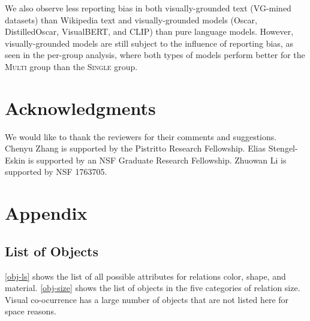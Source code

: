 \documentclass[11pt]{article}
\newcommand{\Single}{{\scshape Single}}
\newcommand{\Multi}{{\scshape Multi}}
\begin{document}
We also observe less reporting bias in both visually-grounded text (VG-mined datasets) than Wikipedia text and visually-grounded models (Oscar, DistilledOscar, VisualBERT, and CLIP) than pure language models. However, visually-grounded models are still subject to the influence of reporting bias, as seen in the per-group analysis, where both types of models perform better for the \Multi{} group than the \Single{} group.

\section*{Acknowledgments}
We would like to thank the reviewers for their comments and suggestions. 
Chenyu Zhang is supported by the Pistritto Research Fellowship.
Elias Stengel-Eskin is supported by an NSF Graduate Research Fellowship. 
Zhuowan Li is supported by NSF 1763705.



\newpage




\newpage

\appendix
\section{Appendix}
\subsection{List of Objects}
\label{sec:list-objs}

\cref{obj-ls} shows the list of all possible attributes for relations color, shape, and material. \cref{obj-size} shows the list of objects in the five categories of relation size. Visual co-ocurrence has a large number of objects that are not listed here for space reasons.
\end{document}
